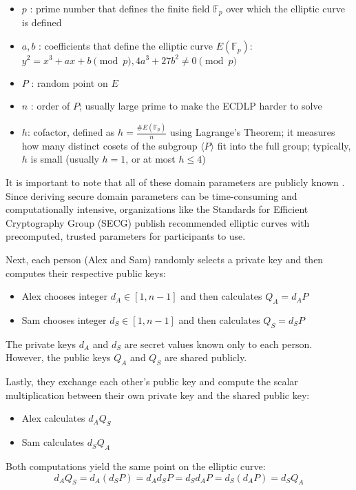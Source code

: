 \documentclass[11pt]{article}
\begin{document}
\begin{itemize}
    \item \(p\) : prime number that defines the finite field \(\mathbb{F}_p\) over which the elliptic curve is defined
    \item \(a,b\) : coefficients that define the elliptic curve \(E(\mathbb{F}_p)\): \(y^2 =x^3+ax+b \pmod p, 4a^3+27b^2\neq 0 \pmod p\)
    \item \(P\) : random point on \(E\) 
    \item \(n\) : order of \(P\); usually large prime to make the ECDLP harder to solve
    \item \(h\): cofactor, defined as \(h = \frac{\#E(\mathbb{F}_p)}{n}\) using Lagrange's Theorem; it measures how many distinct cosets of the subgroup \(\langle P\rangle\) fit into the full group; typically, \(h\) is small (usually \(h = 1\), or at most \(h \leq 4\))
\end{itemize}

It is important to note that all of these domain parameters are publicly known \cite{shevchuk}. Since deriving secure domain parameters can be time-consuming and computationally intensive, organizations like the Standards for Efficient Cryptography Group (SECG) publish recommended elliptic curves with precomputed, trusted parameters for participants to use.

\vspace{0.3cm}

Next, each person (Alex and Sam) randomly selects a private key and then computes their respective public keys:
\begin{itemize}
    \item Alex chooses integer \(d_A\in [1,n-1]\) and then calculates \(Q_A =d_AP\)
    \item Sam chooses integer \(d_S\in[1,n-1]\) and then calculates \(Q_S=d_SP\)
\end{itemize}
The private keys \(d_A\) and \(d_S\) are secret values known only to each person. However, the public keys \(Q_A\) and \(Q_S\) are shared publicly.

\vspace{0.3cm}

Lastly, they exchange each other's public key and compute the scalar multiplication between their own private key and the shared public key:
\begin{itemize}
    \item Alex calculates \(d_AQ_S\)
    \item Sam calculates \(d_SQ_A\)
\end{itemize}
Both computations yield the same point on the elliptic curve:
\[d_A Q_S = d_A(d_S P) = d_A d_S P = d_S d_A P= d_S(d_A P) = d_SQ_A\]
\end{document}
